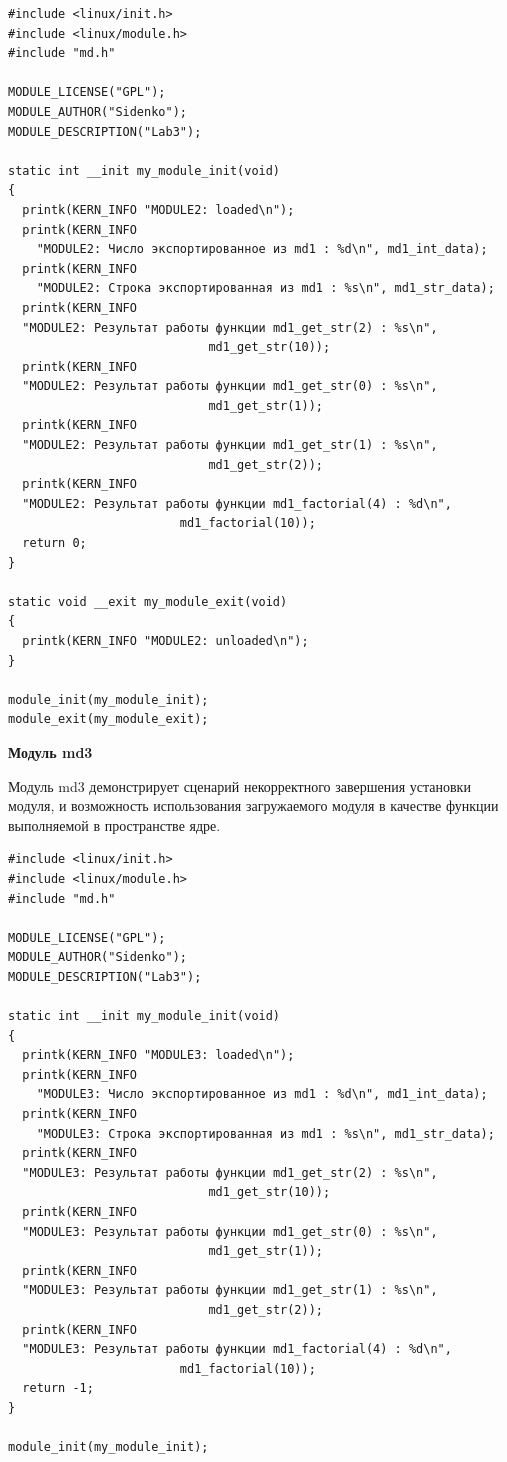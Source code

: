 \documentclass[a4paper,14pt]{extreport} %
\begin{document}
\begin{lstlisting}
#include <linux/init.h>
#include <linux/module.h>
#include "md.h"

MODULE_LICENSE("GPL");
MODULE_AUTHOR("Sidenko");
MODULE_DESCRIPTION("Lab3");

static int __init my_module_init(void)
{
  printk(KERN_INFO "MODULE2: loaded\n");
  printk(KERN_INFO 
  	"MODULE2: Число экспортированное из md1 : %d\n", md1_int_data);
  printk(KERN_INFO 
  	"MODULE2: Строка экспортированная из md1 : %s\n", md1_str_data);
  printk(KERN_INFO 
  "MODULE2: Результат работы функции md1_get_str(2) : %s\n", 
    						md1_get_str(10));
  printk(KERN_INFO 
  "MODULE2: Результат работы функции md1_get_str(0) : %s\n", 
    						md1_get_str(1));
  printk(KERN_INFO 
  "MODULE2: Результат работы функции md1_get_str(1) : %s\n", 
    						md1_get_str(2));
  printk(KERN_INFO 
  "MODULE2: Результат работы функции md1_factorial(4) : %d\n", 
  						md1_factorial(10));
  return 0;
}

static void __exit my_module_exit(void)
{
  printk(KERN_INFO "MODULE2: unloaded\n");
}

module_init(my_module_init);
module_exit(my_module_exit);
\end{lstlisting}

\textbf{Модуль md3}

Модуль md3 демонстрирует сценарий некорректного завершения установки модуля, и возможность использования загружаемого модуля в качестве функции выполняемой в пространстве ядре.

\begin{lstlisting}
#include <linux/init.h>
#include <linux/module.h>
#include "md.h"

MODULE_LICENSE("GPL");
MODULE_AUTHOR("Sidenko");
MODULE_DESCRIPTION("Lab3");

static int __init my_module_init(void)
{
  printk(KERN_INFO "MODULE3: loaded\n");
  printk(KERN_INFO 
  	"MODULE3: Число экспортированное из md1 : %d\n", md1_int_data);
  printk(KERN_INFO 
  	"MODULE3: Строка экспортированная из md1 : %s\n", md1_str_data);
  printk(KERN_INFO 
  "MODULE3: Результат работы функции md1_get_str(2) : %s\n", 
    						md1_get_str(10));
  printk(KERN_INFO 
  "MODULE3: Результат работы функции md1_get_str(0) : %s\n", 
    						md1_get_str(1));
  printk(KERN_INFO 
  "MODULE3: Результат работы функции md1_get_str(1) : %s\n", 
    						md1_get_str(2));
  printk(KERN_INFO 
  "MODULE3: Результат работы функции md1_factorial(4) : %d\n", 
  						md1_factorial(10));
  return -1;
}

module_init(my_module_init);
\end{lstlisting}
\end{document}

